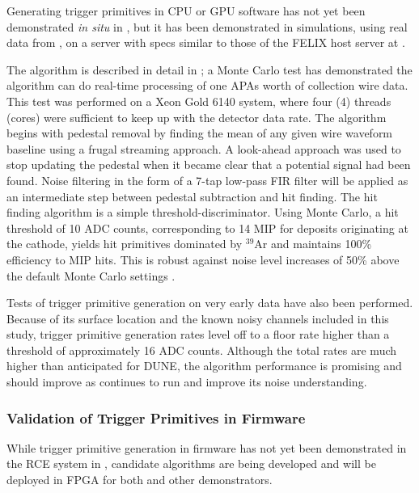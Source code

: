 Generating trigger primitives in CPU or GPU software has not
yet been demonstrated \textit{in situ} in , but it has been
demonstrated in simulations, using real data from , on a
server with specs similar to those 
of the FELIX host server at .

The algorithm is described in detail in \cite{docid-11236}; a Monte Carlo test has demonstrated the algorithm can do real-time processing of one APAs worth
of collection wire data. This test was performed on a Xeon Gold 6140
system, where four (4) threads (cores) were sufficient to keep
up with the detector data rate. The algorithm begins with pedestal removal by
finding the mean of any given wire waveform baseline using a frugal
streaming approach. A look-ahead approach was used to stop
updating the pedestal when it became clear that a potential signal
had been found. Noise filtering in the form of a 7-tap low-pass FIR
filter will be applied as an intermediate step
between pedestal subtraction and hit finding. The hit finding
algorithm is a simple threshold-discriminator. Using Monte Carlo, a hit
threshold of 10 ADC counts, corresponding to 1\/4 MIP for deposits originating at the cathode, yields hit primitives dominated by
$^39$Ar and maintains 100\% efficiency to MIP hits. This is robust against noise level 
increases of 50\% above the default  Monte Carlo settings \cite{docid-11275}. 

Tests of trigger primitive generation on very early  data have also been
performed. Because of its surface
location and the known noisy channels included in this study,
 trigger primitive generation rates level off to a floor rate higher than a threshold
of approximately 16 ADC counts. Although the total rates are much higher than
anticipated for DUNE, the algorithm performance is promising and should improve as  continues
to run and improve its noise understanding.

\subsubsection{Validation of Trigger Primitives in Firmware}
\label{sec:sp-daq:validation-firmware-trigger-primitives}

While trigger primitive generation in firmware has not yet been
demonstrated in the RCE system in , candidate
algorithms are being developed and will be deployed in FPGA
for both  and other demonstrators. 

